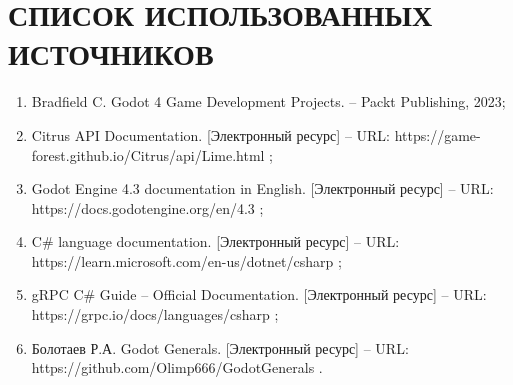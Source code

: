 \section*{СПИСОК ИСПОЛЬЗОВАННЫХ ИСТОЧНИКОВ}
\begin{enumerate}[label=\arabic*.]
    \item Bradfield C. Godot 4 Game Development Projects. -- Packt Publishing, 2023;
    \item Citrus API Documentation. [Электронный ресурс] -- URL: https://game-forest.github.io/Citrus/api/Lime.html ;
    \item Godot Engine 4.3 documentation in English. [Электронный ресурс] -- URL: https://docs.godotengine.org/en/4.3 ;
    \item C\# language documentation. [Электронный ресурс] -- URL: https://learn.microsoft.com/en-us/dotnet/csharp ;
    \item gRPC C\# Guide -- Official Documentation. [Электронный ресурс] -- URL: https://grpc.io/docs/languages/csharp ;
    \item Болотаев Р.А. Godot Generals. [Электронный ресурс] -- URL: https://github.com/Olimp666/GodotGenerals .
\end{enumerate}